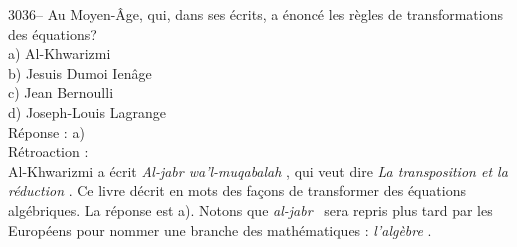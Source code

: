 \documentclass[letterpaper, 12pt]{article}
\begin{document}





3036-- Au Moyen-\^Age, qui, dans ses \'ecrits, a \'enonc\'e les r\`egles de transformations des \'equations?\\

a) Al-Khwarizmi\\
b) Jesuis Dumoi Ien\^age\\
c) Jean Bernoulli\\
d) Joseph-Louis Lagrange\\

R\'eponse : a)\\

R\'etroaction :\\
Al-Khwarizmi a \'ecrit \og \emph{Al-jabr wa'l-muqabalah} \fg, qui veut dire \og \emph{La transposition et la r\'eduction} \fg. Ce livre d\'ecrit en mots des fa\c cons de transformer des \'equations alg\'ebriques. La r\'eponse est a). Notons que \og \emph{al-jabr} \fg \ sera repris plus tard par les Europ\'eens pour nommer une branche des math\'ematiques : \og \emph{l'alg\`ebre} \fg.
\end{document}
